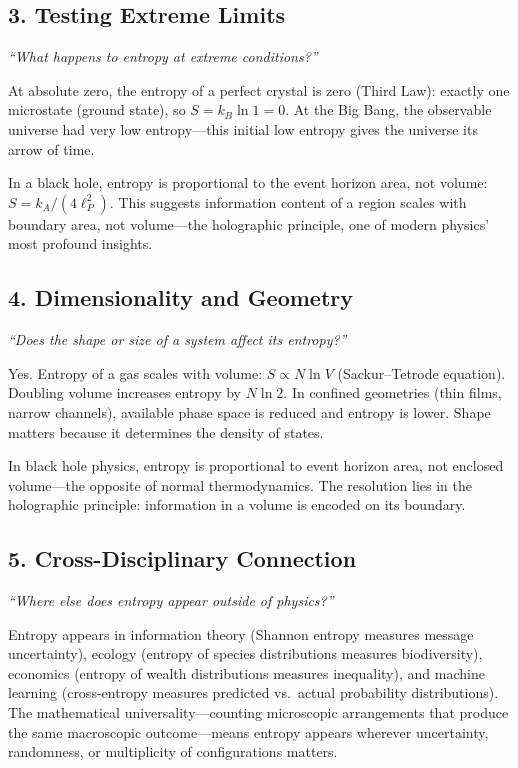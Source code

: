 \documentclass[11pt,openright]{book}
\begin{document}
\subsection*{3. Testing Extreme Limits}
\textit{``What happens to entropy at extreme conditions?''}

At absolute zero, the entropy of a perfect crystal is zero (Third Law): exactly one microstate (ground state), so $S = k_B \ln 1 = 0$. At the Big Bang, the observable universe had very low entropy---this initial low entropy gives the universe its arrow of time.

In a black hole, entropy is proportional to the event horizon area, not volume: $S = k_A / (4 \ell_P^2)$. This suggests information content of a region scales with boundary area, not volume---the holographic principle, one of modern physics' most profound insights.

\subsection*{4. Dimensionality and Geometry}
\textit{``Does the shape or size of a system affect its entropy?''}

Yes. Entropy of a gas scales with volume: $S \propto N \ln V$ (Sackur--Tetrode equation). Doubling volume increases entropy by $N \ln 2$. In confined geometries (thin films, narrow channels), available phase space is reduced and entropy is lower. Shape matters because it determines the density of states.

In black hole physics, entropy is proportional to event horizon area, not enclosed volume---the opposite of normal thermodynamics. The resolution lies in the holographic principle: information in a volume is encoded on its boundary.

\subsection*{5. Cross-Disciplinary Connection}
\textit{``Where else does entropy appear outside of physics?''}

Entropy appears in information theory (Shannon entropy measures message uncertainty), ecology (entropy of species distributions measures biodiversity), economics (entropy of wealth distributions measures inequality), and machine learning (cross-entropy measures predicted vs.\ actual probability distributions). The mathematical universality---counting microscopic arrangements that produce the same macroscopic outcome---means entropy appears wherever uncertainty, randomness, or multiplicity of configurations matters.
\end{document}
